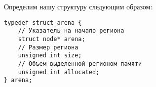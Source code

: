 Определим нашу структуру следующим образом:

\begin{verbatim}
typedef struct arena { 
    // Указатель на начало региона 
    struct node* arena; 
    // Размер региона 
    unsigned int size; 
    // Объем выделенной регионом памяти
    unsigned int allocated; 
} arena;
\end{verbatim}